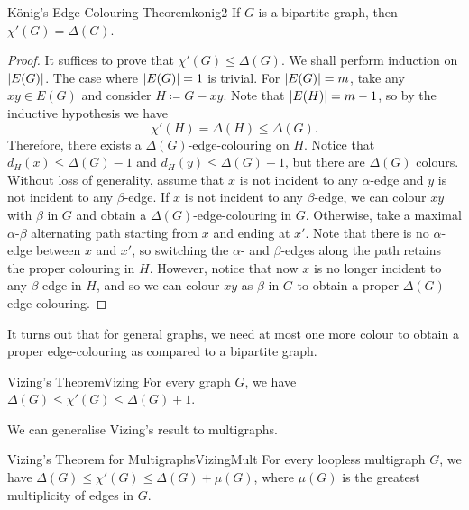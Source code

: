 \documentclass[math, code]{amznotes}
\theoremstyle{remark}
\begin{document}
\begin{thmbox}{K\"{o}nig's Edge Colouring Theorem}{konig2}
    If $G$ is a bipartite graph, then $\chi'(G) = \Delta(G)$.
    \tcblower
    \begin{proof}
        It suffices to prove that $\chi'(G) \leq \Delta(G)$. We shall perform induction on ${\left\lvert {E(G)} \right\rvert}$. The case where ${\left\lvert {E(G)} \right\rvert} = 1$ is trivial. For ${\left\lvert {E(G)} \right\rvert} = m$, take any $xy \in E(G)$ and consider $H \coloneqq G - xy$. Note that ${\left\lvert {E(H)} \right\rvert} = m - 1$, so by the inductive hypothesis we have 
        \begin{equation*}
            \chi'(H) = \Delta(H) \leq \Delta(G).
        \end{equation*}
        Therefore, there exists a $\Delta(G)$-edge-colouring on $H$. Notice that $d_H(x) \leq \Delta(G) - 1$ and $d_H(y) \leq \Delta(G) - 1$, but there are $\Delta(G)$ colours. Without loss of generality, assume that $x$ is not incident to any $\alpha$-edge and $y$ is not incident to any $\beta$-edge. If $x$ is not incident to any $\beta$-edge, we can colour $xy$ with $\beta$ in $G$ and obtain a $\Delta(G)$-edge-colouring in $G$. Otherwise, take a maximal $\alpha$-$\beta$ alternating path starting from $x$ and ending at $x'$. Note that there is no $\alpha$-edge between $x$ and $x'$, so switching the $\alpha$- and $\beta$-edges along the path retains the proper colouring in $H$. However, notice that now $x$ is no longer incident to any $\beta$-edge in $H$, and so we can colour $xy$ as $\beta$ in $G$ to obtain a proper $\Delta(G)$-edge-colouring.
    \end{proof}
\end{thmbox}
It turns out that for general graphs, we need at most one more colour to obtain a proper edge-colouring as compared to a bipartite graph.
\begin{thmbox}{Vizing's Theorem}{Vizing}
    For every graph $G$, we have $\Delta(G) \leq \chi'(G) \leq \Delta(G) + 1$.
\end{thmbox}
We can generalise Vizing's result to multigraphs.
\begin{corbox}{Vizing's Theorem for Multigraphs}{VizingMult}
    For every loopless multigraph $G$, we have $\Delta(G) \leq \chi'(G) \leq \Delta(G) + \mu(G)$, where $\mu(G)$ is the greatest multiplicity of edges in $G$.
\end{corbox}
\end{document}
